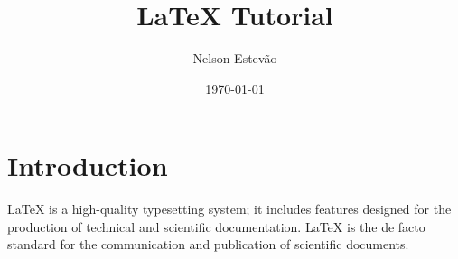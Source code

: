 \documentclass{report}
\title{LaTeX Tutorial}
\author{Nelson Estevão}
\date{\today}
\begin{document}
\maketitle

\section{Introduction}

{\LaTeX} is a high-quality typesetting system; it includes features designed for
the production of technical and scientific documentation. LaTeX is the de facto
standard for the communication and publication of scientific documents.
\end{document}
